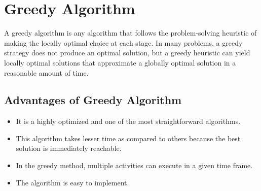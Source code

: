 \documentclass[11pt, twosides]{article}
\begin{document}



\section{Greedy Algorithm}

A greedy algorithm is any algorithm that follows the problem-solving heuristic of making the locally optimal choice at each stage. In many problems, a greedy strategy does not produce an optimal solution, but a greedy heuristic can yield locally optimal solutions that approximate a globally optimal solution in a reasonable amount of time.
\subsection{Advantages of Greedy Algorithm}
\begin{itemize}
    \item It is a highly optimized and one of the most straightforward algorithms.
    \item This algorithm takes lesser time as compared to others because the best solution is immediately reachable.
    \item In the greedy method, multiple activities can execute in a given time frame.
    \item The algorithm is easy to implement.
\end{itemize}
\end{document}
